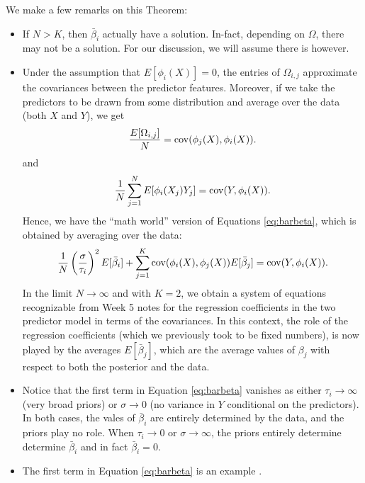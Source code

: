 \begin{itemize}
\begin{thm}
\end{thm}
We make a few remarks on this Theorem:
\begin{itemize}
\item If $N> K$, then $\bar{\beta}_i$ actually have a solution. In-fact, depending on $\Omega$, there may not be a solution. For our discussion, we will assume there is however. 
\item Under the assumption that $E[\phi_i(X)]=0$, the entries of $\Omega_{i,j}$ approximate the covariances between the predictor features. Moreover, if we take the predictors to be drawn from some distribution and average over the data (both $X$ and $Y$), we get
\begin{equation*}
\frac{E[\Omega_{i,j}]}{N}=  {\rm cov}(\phi_j(X),\phi_i(X)).
\end{equation*}
and  
\begin{equation*}
\frac{1}{N}\sum_{j=1}^NE[\phi_i(X_j)Y_j]= {\rm cov}(Y,\phi_i(X)).
\end{equation*}
Hence, we have the ``math world'' version of Equations \ref{eq:barbeta}, which is obtained by averaging over the data: 
\begin{equation*}
 \frac{1}{N}\left(\frac{\sigma}{\tau_i}\right)^{2}E[\bar{\beta}_i]  + \sum_{j=1}^K{\rm cov}(\phi_i(X),\phi_j(X))E[\bar{\beta}_j] = {\rm cov}(Y,\phi_i(X)).
\end{equation*}
In the limit $N \to \infty$ and with $K=2$, we obtain a system of equations recognizable from Week 5 notes for the regression coefficients in the two predictor model in terms of the covariances. In this context, the role of the regression coefficients (which we previously took to be fixed numbers), is now played by the averages $E[\bar{\beta}_j]$, which are the average values of $\beta_j$ with respect to both the posterior and the data. 
\item Notice that the first term in  Equation \ref{eq:barbeta} vanishes as either $\tau_i \to \infty$ (very broad priors) or $\sigma \to 0$ (no variance in $Y$ conditional on the predictors). In both cases, the vales of $\bar{\beta}_i$ are entirely determined by the data, and the priors play no role. When $\tau_i \to 0$ or $\sigma \to \infty$, the priors entirely determine determine $\bar{\beta}_i$ and in fact $\bar{\beta}_i =0$. 
\item The first term in  Equation \ref{eq:barbeta} is an example . 
\end{itemize}



\end{itemize}
